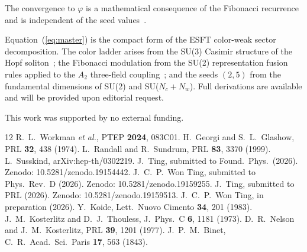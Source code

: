﻿\documentclass[twocolumn,showpacs,preprintnumbers,amsmath,amssymb,prl]{revtex4-2}
\begin{document}
The convergence to $\varphi$ is a mathematical consequence of the Fibonacci recurrence and is independent of the seed values~\cite{Binet}.

Equation~(\ref{eq:master}) is the compact form of the ESFT color-weak sector decomposition. The color ladder arises from the SU(3) Casimir structure of the Hopf soliton~\cite{Paper2}; the Fibonacci modulation from the SU(2) representation fusion rules applied to the $A_2$ three-field coupling~\cite{Paper1,Paper4}; and the seeds $(2,5)$ from the fundamental dimensions of SU(2) and SU($N_c{+}N_w$). Full derivations are available and will be provided upon editorial request.

\begin{acknowledgments}
This work was supported by no external funding. \end{acknowledgments}

\begin{thebibliography}{12}
 R.~L.~Workman \textit{et al.}, PTEP \textbf{2024}, 083C01.
 H.~Georgi and S.~L.~Glashow, PRL \textbf{32}, 438 (1974).
 L.~Randall and R.~Sundrum, PRL \textbf{83}, 3370 (1999).
 L.~Susskind, arXiv:hep-th/0302219.
 J.~Ting, submitted to Found.\ Phys.\ (2026). Zenodo: 10.5281/zenodo.19154442.
 J.~C.~P.~Won Ting, submitted to Phys.\ Rev.\ D (2026). Zenodo: 10.5281/zenodo.19159255.
 J.~Ting, submitted to PRL (2026). Zenodo: 10.5281/zenodo.19159513.
 J.~C.~P.~Won Ting, in preparation (2026).
 Y.~Koide, Lett.\ Nuovo Cimento \textbf{34}, 201 (1983).
 J.~M.~Kosterlitz and D.~J.~Thouless, J.\ Phys.\ C \textbf{6}, 1181 (1973).
 D.~R.~Nelson and J.~M.~Kosterlitz, PRL \textbf{39}, 1201 (1977).
 J.~P.~M.~Binet, C.\ R.\ Acad.\ Sci.\ Paris \textbf{17}, 563 (1843).
\end{thebibliography}
\end{document}
